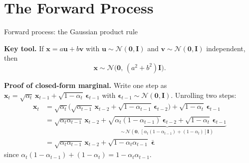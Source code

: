 \documentclass[aspectratio=169,11pt]{beamer}
\newcommand{\Norm}{\mathcal{N}}
\newcommand{\bx}{\bm{x}}
\newcommand{\beps}{\bm{\epsilon}}
\begin{document}
\section{The Forward Process}

\begin{frame}{Forward process: the Gaussian product rule}

\textbf{Key tool.} If $\bx = a\bm{u} + b\bm{v}$ with
$\bm{u}\sim\Norm(\bm{0},\mathbf{I})$ and $\bm{v}\sim\Norm(\bm{0},\mathbf{I})$
independent, then
\[
  \bx \sim \Norm\!\bigl(\bm{0},\,(a^2+b^2)\mathbf{I}\bigr).
\]

\textbf{Proof of closed-form marginal.}
Write one step as $\bx_t = \sqrt{\alpha_t}\,\bx_{t-1} + \sqrt{1-\alpha_t}\,\beps_{t-1}$
with $\beps_{t-1}\sim\Norm(\bm{0},\mathbf{I})$.  Unrolling two steps:
\begin{align*}
\bx_t
&= \sqrt{\alpha_t}\bigl(\sqrt{\alpha_{t-1}}\,\bx_{t-2}
   + \sqrt{1-\alpha_{t-1}}\,\beps_{t-2}\bigr)
   + \sqrt{1-\alpha_t}\,\beps_{t-1}\\
&= \sqrt{\alpha_t\alpha_{t-1}}\,\bx_{t-2}
   + \underbrace{\sqrt{\alpha_t(1-\alpha_{t-1})}\,\beps_{t-2}
     + \sqrt{1-\alpha_t}\,\beps_{t-1}}_{\sim\,\Norm(\bm{0},\,
       [\alpha_t(1-\alpha_{t-1})+(1-\alpha_t)]\mathbf{I})}\\
&= \sqrt{\alpha_t\alpha_{t-1}}\,\bx_{t-2}
   + \sqrt{1-\alpha_t\alpha_{t-1}}\;\bar{\beps}
\end{align*}
since $\alpha_t(1-\alpha_{t-1})+(1-\alpha_t) = 1-\alpha_t\alpha_{t-1}$.
\end{frame}
\end{document}
